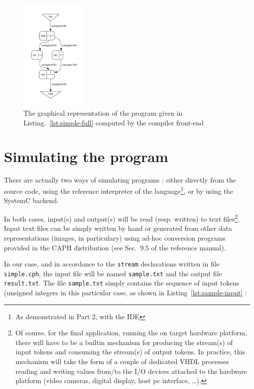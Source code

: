 \begin{figure}[htbp]
  \centering
 \includegraphics[width=0.3\textwidth]{./figs/simple-dot.pdf}
  \caption{The graphical representation of the program given in Listing.~\ref{lst:simple-full} computed
    by the \caph compiler front-end} 
  \label{fig:simple-dot}
\end{figure}

\section{Simulating the program}
\label{sec:simulation}


There are actually two ways of simulating programs : either directly from the source code, using the
reference interpreter of the language\footnote{As demonstrated in Part 2, with the IDE}, or by using
the SystemC backend.

In both cases, input(s) and output(s) will be read (resp. written) to text files\footnote{Of
  course, for the final application, running the on target hardware platform, there will have to be
  a builtin mechanism for producing the stream(s) of input tokens and consuming the stream(s) of
  output tokens. In practice, this mechanism will take the form of a couple 
  of dedicated VHDL processes reading and writing values from/to the I/O devices attached to the
  hardware platform (video cameras, digital display, host pc interface, \ldots).}.
Input text files can be simply written by hand or generated from other data representations (images,
in particulary) using ad-hoc conversion programs provided in the CAPH distribution (see Sec.~9.5 of
the reference manual). 

In our case, and in accordance to the
\verb|stream| declarations written in file \verb|simple.cph|, the input file will be named
\verb|sample.txt| and the output file \verb|result.txt|. The file \verb|sample.txt| simply contains
the sequence of input tokens (unsigned integers in this particular case, as shown in
Listing~\ref{lst:sample-input} :

